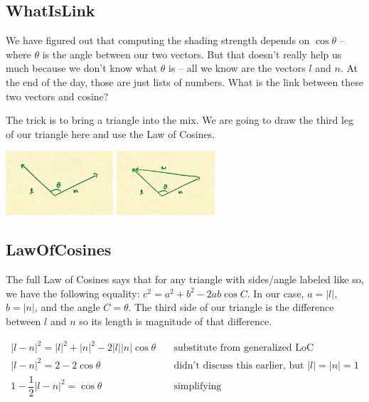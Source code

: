 \documentclass{article}
\begin{document}
\subsection{WhatIsLink}

We have figured out that computing the shading strength depends on $\cos \theta$ -- where $\theta$ is the angle between our two vectors.
But that doesn't really help us much because we don't know what $\theta$ is -- all we know are the vectors $l$ and $n$.
At the end of the day, those are just lists of numbers.
What is the link between these two vectors and cosine?

The trick is to bring a triangle into the mix.
We are going to draw the third leg of our triangle here and use the Law of Cosines.

\begin{center}
	\includegraphics[width=0.3\textwidth,frame]{assets/ln.jpg}
	\hspace{0.2\textwidth}
	\includegraphics[width=0.2735\textwidth,frame]{assets/lnw.jpg}
\end{center}

\subsection{LawOfCosines}

The full Law of Cosines says that for any triangle with sides/angle labeled like so, we have the following equality: $c^2 = a^2 + b^2 - 2ab \cos C$.
In our case, $a = |l|$, $b = |n|$, and the angle $C = \theta$.
The third side of our triangle is the difference between $l$ and $n$ so its length is magnitude of that difference.

\begin{align*}
|l-n|^2 = |l|^2 + |n|^2 - 2 |l| |n| \cos \theta & \quad \text{substitute from generalized LoC} \\
|l-n|^2 = 2 - 2 \cos \theta & \quad \text{didn't discuss this earlier, but } |l| = |n| = 1 \\
1 - \dfrac{1}{2}|l-n|^2 = \cos \theta & \quad \text{simplifying}
\end{align*}
\end{document}
